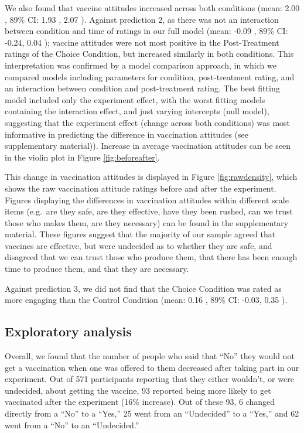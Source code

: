 \documentclass[
  english,
  ,jou,floatsintext]{apa6}
\begin{document}
We also found that vaccine attitudes increased across both conditions (mean: 2.00 , 89\% CI: 1.93 , 2.07 ). Against prediction 2, as there was not an interaction between condition and time of ratings in our full model (mean: -0.09 , 89\% CI: -0.24, 0.04 ); vaccine attitudes were not most positive in the Post-Treatment ratings of the Choice Condition, but increased similarly in both conditions. This interpretation was confirmed by a model comparison approach, in which we compared models including parameters for condition, post-treatment rating, and an interaction between condition and post-treatment rating. The best fitting model included only the experiment effect, with the worst fitting models containing the interaction effect, and just varying intercepts (null model), suggesting that the experiment effect (change across both conditions) was most informative in predicting the difference in vaccination attitudes (see supplementary material)). Increase in average vaccination attitudes can be seen in the violin plot in Figure \ref{fig:beforeafter}.

This change in vaccination attitudes is displayed in Figure \ref{fig:rawdensity}, which shows the raw vaccination attitude ratings before and after the experiment. Figures displaying the differences in vaccination attitudes within different scale items (e.g.~are they safe, are they effective, have they been rushed, can we trust those who makes them, are they necessary) can be found in the supplementary material. These figures suggest that the majority of our sample agreed that vaccines are effective, but were undecided as to whether they are safe, and disagreed that we can trust those who produce them, that there has been enough time to produce them, and that they are necessary.

Against prediction 3, we did not find that the Choice Condition was rated as more engaging than the Control Condition (mean: 0.16 , 89\% CI: -0.03, 0.35 ).

\hypertarget{exploratory-analysis}{%
\subsection{Exploratory analysis}\label{exploratory-analysis}}

Overall, we found that the number of people who said that ``No'' they would not get a vaccination when one was offered to them decreased after taking part in our experiment. Out of 571 participants reporting that they either wouldn't, or were undecided, about getting the vaccine, 93 reported being more likely to get vaccinated after the experiment (16\% increase). Out of these 93, 6 changed directly from a ``No'' to a ``Yes,'' 25 went from an ``Undecided'' to a ``Yes,'' and 62 went from a ``No'' to an ``Undecided.''
\end{document}
